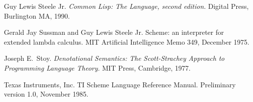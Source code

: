 \begin{thebibliography}{999}
Guy Lewis Steele Jr.
{\em Common Lisp: The Language, second edition.}
Digital Press, Burlington MA, 1990.

Gerald Jay Sussman and Guy Lewis Steele Jr.
Scheme: an interpreter for extended lambda calculus.
MIT Artificial Intelligence Memo 349, December 1975.

Joseph E.~Stoy.
{\em Denotational Semantics: The Scott-Strachey Approach to
  Programming Language Theory.}
MIT Press, Cambridge, 1977.

Texas Instruments, Inc.
TI Scheme Language Reference Manual.
Preliminary version 1.0, November 1985. 



\end{thebibliography}

